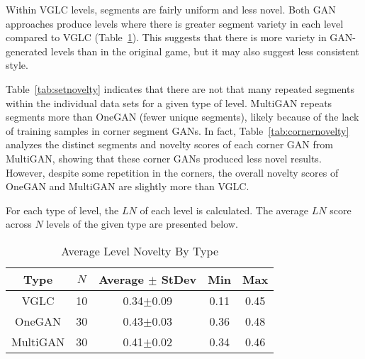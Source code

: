 
Within VGLC levels, segments are fairly uniform and less novel. Both GAN approaches produce levels where there is greater segment variety in each level compared to VGLC (Table~\ref{tab:avgnovelty}). This suggests that there is more variety in GAN-generated levels than in the original game, but it may also suggest less consistent style. 

Table~\ref{tab:setnovelty} indicates that there are not that many repeated segments within the individual data sets for a given type of level. MultiGAN repeats segments more than OneGAN (fewer unique segments), likely because of the lack of training samples in corner segment GANs. 
In fact, Table~\ref{tab:cornernovelty} analyzes the distinct segments and novelty scores of each corner GAN from MultiGAN, showing that these corner GANs produced less novel results. However, despite some repetition in the corners, the overall novelty scores of OneGAN and MultiGAN are slightly more than VGLC. 




\begin{table}[t!]
\caption{\label{tab:avgnovelty}Average Level Novelty By Type}
{\small For each type of level, the $LN$ of each level is calculated. The
average $LN$ score across $N$ levels of the given type are presented below.}

\centering
\begin{tabular}{|c|c|c|c|c|}
\hline
Type & $N$ & Average $\pm$ StDev & Min & Max \\ 
\hline
VGLC& 10 & 0.34$\pm$0.09 & 0.11 & 0.45\\ 
\hline 
OneGAN & 30 & 0.43$\pm$0.03 & 0.36 & 0.48\\
\hline
MultiGAN & 30 & 0.41$\pm$0.02 & 0.34 & 0.46 \\
\hline

\end{tabular}
\end{table}

